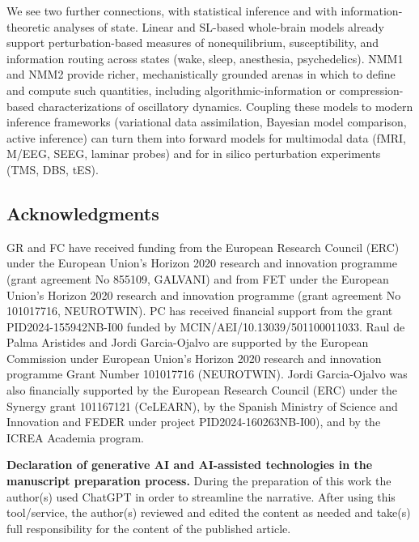 \documentclass[12pt]{article}
\numberwithin{equation}{section}
\newcommand{\rev}[1]{\begingroup\color{navyblue}#1\endgroup}
\begin{document}
\rev{We see two further connections, with statistical inference and with information-theoretic analyses of state.} Linear and SL-based whole-brain models already support perturbation-based measures of nonequilibrium, susceptibility, and information routing across states (wake, sleep, anesthesia, psychedelics).\cite{decoTurbulentlikeDynamicsHuman2020,Escrichs2022Turbulence,cruzatEffectsClassicPsychedelic2022} NMM1 and NMM2 provide richer, mechanistically grounded arenas in which to define and compute such quantities, including algorithmic-information or compression-based characterizations of oscillatory dynamics. Coupling these models to modern inference frameworks (variational data assimilation, Bayesian model comparison, active inference) can turn them into forward models for multimodal data (fMRI, M/EEG, SEEG, laminar probes) and for in silico perturbation experiments (TMS, DBS, tES).\cite{breakspearDynamicModelsLargescale2017,Sadeghi2020,duchetHowDesignOptimal2024,ruffiniAlgorithmicAgentPerspective2024} 




 \subsection*{Acknowledgments}
GR and FC have received funding from the European Research Council (ERC) under the European Union’s Horizon 2020 research and innovation programme (grant agreement No 855109, GALVANI) and from FET under the European Union’s Horizon 2020 research and innovation programme (grant agreement No 101017716, NEUROTWIN). 
PC has received financial support from the grant PID2024-155942NB-I00 funded by MCIN/AEI/10.13039/501100011033.
Raul de Palma Aristides and Jordi Garcia-Ojalvo are supported by the European Commission under European Union’s Horizon 2020 research and innovation programme Grant Number 101017716 (NEUROTWIN). Jordi Garcia-Ojalvo was also financially supported by the European Research Council (ERC) under the Synergy grant 101167121 (CeLEARN), by the Spanish Ministry of Science and Innovation and FEDER under project PID2024-160263NB-I00), and by the ICREA Academia program.

\textbf{Declaration of generative AI and AI-assisted technologies in the manuscript preparation process.}
During the preparation of this work the author(s) used ChatGPT in order to streamline the narrative. After using this tool/service, the author(s) reviewed and edited the content as needed and take(s) full responsibility for the content of the published article.



\clearpage


\end{document}
